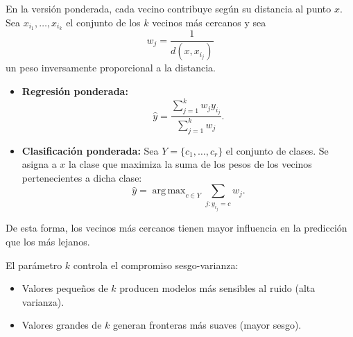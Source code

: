 \documentclass[a4,11pt]{aleph-notas}
\DeclareMathOperator*{\argmax}{\arg\,\max}
\begin{document}
\begin{defi}[k-NN ponderado]
En la versión ponderada, cada vecino contribuye según su distancia al punto \(x\).  
Sea \(x_{i_1},\ldots,x_{i_k}\) el conjunto de los \(k\) vecinos más cercanos y sea
\[
w_j = \frac{1}{d(x,x_{i_j})}
\]
un peso inversamente proporcional a la distancia.

\begin{itemize}
    \item \textbf{Regresión ponderada:}
    \[
    \hat{y} = \frac{\sum_{j=1}^{k} w_j y_{i_j}}{\sum_{j=1}^{k} w_j}.
    \]

    \item \textbf{Clasificación ponderada:}
    Sea \(Y = \{c_1,\ldots,c_r\}\) el conjunto de clases.  
    Se asigna a \(x\) la clase que maximiza la suma de los pesos de los vecinos pertenecientes a dicha clase:
    \[
    \hat{y} = \argmax_{c \in Y} \sum_{j : y_{i_j}=c} w_j.
    \]
\end{itemize}

De esta forma, los vecinos más cercanos tienen mayor influencia en la predicción que los más lejanos.
\end{defi}



\begin{advertencia}
El parámetro \(k\) controla el compromiso sesgo-varianza:
\begin{itemize}
    \item Valores pequeños de \(k\) producen modelos más sensibles al ruido (alta varianza).
    \item Valores grandes de \(k\) generan fronteras más suaves (mayor sesgo).
\end{itemize}
\end{advertencia}
\end{document}
